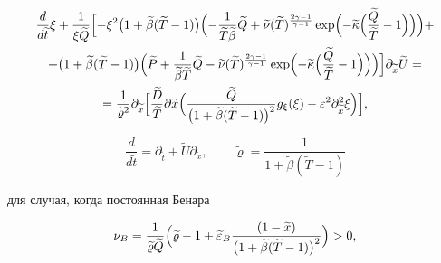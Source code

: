 \begin{multline}

\frac{d}{d\widetilde{t}} \xi+\frac1{\xi \widetilde{Q}}

\Bigl[-\xi^2 \big(1+\widetilde{\beta}(\widetilde{T}-1)\big)

\Bigl(-\frac{1}{\widetilde{T} \widetilde{\beta}} \widetilde{Q}+\widetilde{\nu}

(\widetilde{T})^{\frac{2\gamma-1}{\gamma-1}}

 \exp\Bigl(-\widetilde{\kappa}\Bigl(\frac{\widetilde{Q}}{\widetilde{T}}-1\Bigr) \Bigr)

 \Bigr)+

\\

+\bigl(1+\widetilde{\beta}(\widetilde{T}-1)\bigr)

\Bigl(\widetilde{P}+\frac{1}{\widetilde{\beta}\widetilde{T}} \widetilde{Q}-\widetilde{\nu} (\widetilde{T})^{\frac{2\gamma-1}{\gamma-1}} 

\exp\Bigl(-\widetilde{\kappa}\Bigl(\frac{\widetilde{Q}}{\widetilde{T}}-1\Bigr) \Bigr)\Bigr) \Bigr]{\partial}_{\widetilde{x}} \widetilde{U}=

\\

=\frac1{\widetilde{\varrho}^2} {\partial}_{\widetilde{x}} 

\Bigl[\frac{\widetilde{D}}{\widetilde{T}} {\partial}{\widetilde{x}}

\Bigl(\frac{\widetilde{Q}}{\bigl(1+\widetilde{\beta}(\widetilde{T}-1)\bigr)^{2}}

g_\xi(\xi)-{\varepsilon}^2 \partial^2_{\widetilde{x}}\xi

\Bigr)\Bigr],

\end{multline}

$$

\frac{d}{d\widetilde{t}}={\partial}_{\widetilde{t}}+\widetilde{U}{\partial}_{\widetilde{x}},\qquad

\widetilde{\varrho}=\frac1{1+\widetilde{\beta}(\widetilde{T}-1)}

$$

для случая, когда постоянная Бенара

\begin{gather}

\nu_B=\frac1{\widetilde{\varrho}\widetilde{Q}}

\Bigl(

{\widetilde{\varrho}-1+\widetilde{\varepsilon}_B\frac {(1- \widetilde{x})}{\bigl(1+\widetilde{\beta}(\widetilde{T}-1)\bigr)^2} }\Bigr)>0,

\label{lukashev:nuB}

\end{gather}

